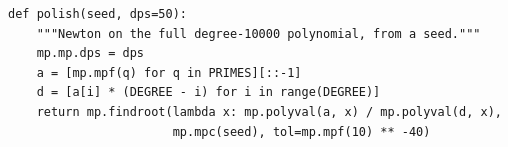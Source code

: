 \begin{verbatim}
def polish(seed, dps=50):
    """Newton on the full degree-10000 polynomial, from a seed."""
    mp.mp.dps = dps
    a = [mp.mpf(q) for q in PRIMES][::-1]
    d = [a[i] * (DEGREE - i) for i in range(DEGREE)]
    return mp.findroot(lambda x: mp.polyval(a, x) / mp.polyval(d, x),
                       mp.mpc(seed), tol=mp.mpf(10) ** -40)
\end{verbatim}
